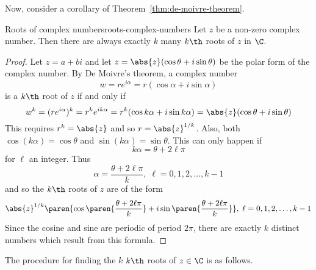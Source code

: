 Now, consider a corollary of Theorem~\ref{thm:de-moivre-theorem}.

\begin{corollary}{Roots of complex numbers}{roots-complex-numbers}
Let $z$ be a non-zero complex number.
Then there are always exactly $k$ many  $k\th$
roots of $z$ in $\C$.
\end{corollary}

\begin{proof}
Let $z=a+bi$ and let $z=\abs{z}(\cos
\theta+i\sin \theta) $ be the polar form of the complex number. By De Moivre's
theorem, a complex number
\begin{equation*}
w= r e^{i \alpha} = r(\cos \alpha +i\sin \alpha) 
\end{equation*}
is a $k\th$ root of $z$ if and only if
\begin{equation*}
w^k = (r e^{i \alpha})^k = r^k e^{ik\alpha} = r^{k}(\cos k\alpha +i\sin k\alpha) =\abs{z}(\cos \theta+i\sin \theta) 
\end{equation*}
This requires $r^{k}=\abs{z}$ and so $r=\abs{z}^{1/k}$. Also, both $\cos (k\alpha) =\cos \theta$ and
$\sin (k\alpha) =\sin \theta$. This can only happen if
\begin{equation*}
k\alpha =\theta+2 \ell \pi
\end{equation*}
for $\ell$ an integer. Thus
\begin{equation*}
\alpha =
\frac{\theta+2 \ell \pi }{k},\; \ell = 0, 1, 2,\ldots, k-1 
\end{equation*}
and so the $k\th$ roots of $z$ are of the form
\begin{equation*}
\abs{z}^{1/k}\paren{\cos \paren{\frac{\theta+2 \ell \pi }{k}}
+i\sin \paren{\frac{\theta+2 \ell \pi }{k}}} ,\;\ell = 0, 1, 2,\ldots, k-1 
\end{equation*}
Since the cosine and sine are periodic of period $2\pi$, there are exactly $
k$ distinct numbers which result from this formula. 
\end{proof}

The procedure for finding the $k$ $k\th$ roots of $z \in \C$ is as follows.

